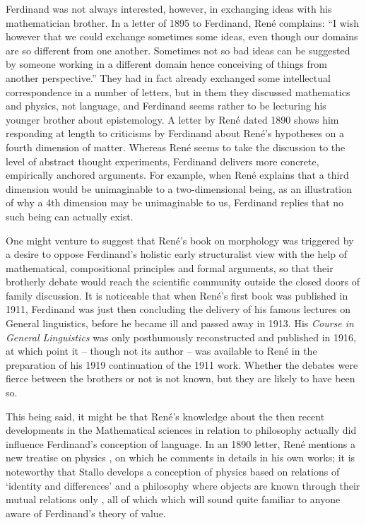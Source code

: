 \begin{refsection}
Ferdinand was not always interested, however, in exchanging ideas with
his mathematician brother. In a letter of 1895 to Ferdinand, René
complains: ``I wish however that we could exchange sometimes some
ideas, even though our domains are so different from one
another. Sometimes not so bad ideas can be suggested by someone
working in a different domain hence conceiving of things from another
perspective.'' They had in fact already exchanged some intellectual
correspondence in a number of letters, but in them they discussed
mathematics and physics, not language, and Ferdinand seems rather to
be lecturing his younger brother about epistemology. A letter by René
dated 1890 shows him responding at length to criticisms by Ferdinand
about René’s hypotheses on a fourth dimension of matter. Whereas René
seems to take the discussion to the level of abstract thought
experiments, Ferdinand delivers more concrete, empirically anchored
arguments. For example, when René explains that a third dimension
would be unimaginable to a two-dimensional being, as an illustration
of why a 4th dimension may be unimaginable to us, Ferdinand replies
that no such being can actually exist.

One might venture to suggest that René’s book on morphology was
triggered by a desire to oppose Ferdinand’s holistic early
structuralist view with the help of mathematical, compositional
principles and formal arguments, so that their brotherly debate would
reach the scientific community outside the closed doors of family
discussion. It is noticeable that when René’s first book was published
in 1911, Ferdinand was just then concluding the delivery of his famous
lectures on General linguistics, before he became ill and passed away
in 1913. His \textsl{Course in General Linguistics}
\citep{saussure16:cours-original} was only posthumously reconstructed
and published in 1916, at which point it -- though not its author --
was available to René in the preparation of his 1919 continuation of
the 1911 work. Whether the debates were fierce between the brothers or
not is not known, but they are likely to have been so.

This being said, it might be that René’s knowledge about the then
recent developments in the Mathematical sciences in relation to
philosophy actually did influence Ferdinand’s conception of
language. In an 1890 letter, René mentions a new treatise on physics
\citep{Stallo1882:physics}, on which he comments in details in his own
works; it is noteworthy that Stallo develops a conception of physics
based on relations of `identity and differences' and a philosophy
where objects are known through their mutual relations only
, all of which which will sound quite
familiar to anyone aware of Ferdinand’s theory of value.
	

\end{refsection}
